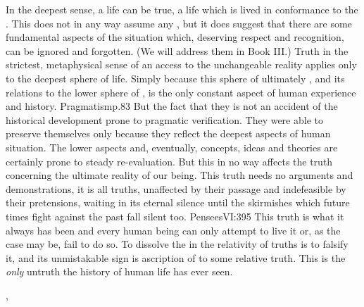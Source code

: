 In the deepest sense, a life can be true, a life which is lived in conformance
to the . This does not in any way assume any , but it does suggest that there are some fundamental aspects of the
 situation which, deserving respect and recognition, can be
ignored and forgotten. (We will address them in Book III.)  Truth in the
strictest, metaphysical sense of an access to the unchangeable reality applies
only to the deepest sphere of life.  Simply because this sphere of ultimately
, and its relations to the lower sphere of
, is the only constant aspect of human experience and history.
\citet{Our fundamental ways of thinking about things are discoveries of
  exceedingly remote ancestors, which have been able to preserve themselves
  throughout the experience of all subsequent times.}{Pragmatism}{p.83 
  } But the fact that they  is not an accident of the historical development prone to
pragmatic verification. They were able to preserve themselves only because they
reflect the deepest aspects of human 
situation.  The lower aspects and, eventually, concepts, ideas and theories are
certainly prone to steady re-evaluation.  But this in no way affects the truth
concerning the ultimate reality of our being. This truth needs no arguments and
demonstrations, it is  all truths, unaffected by their passage and
indefeasible by their pretensions, waiting in its eternal silence until the
skirmishes which future times fight against the past fall silent too. \citet{We
  have incapacity of proof, insurmountable by all dogmatism.  We have an idea of
  truth, invincible to all scepticism.}{Pensees}{VI:395} This truth is what it
always has been and every human being can only attempt to live it or, as the
case may be, fail to do so.  To dissolve the  in the relativity of
 truths is to falsify it, and its unmistakable sign is ascription of
 to some relative truth.  This is the {\em only} 
untruth the history of human life has ever seen.

\sep

